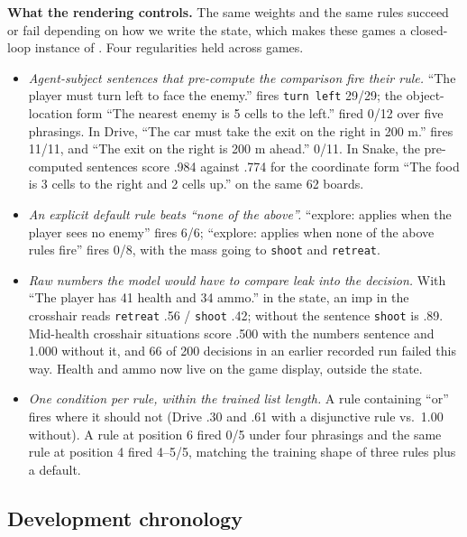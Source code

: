 \textbf{What the rendering controls.} The same weights and the same rules succeed or fail depending on
how we write the state, which makes these games a closed-loop instance of .
Four regularities held across games.
\begin{itemize}
  \item \emph{Agent-subject sentences that pre-compute the comparison fire their rule.} ``The player
  must turn left to face the enemy.'' fires \texttt{turn left} 29/29; the object-location form ``The
  nearest enemy is 5 cells to the left.'' fired 0/12 over five phrasings. In Drive, ``The car must take
  the exit on the right in 200 m.'' fires 11/11, and ``The exit on the right is 200 m ahead.'' 0/11. In
  Snake, the pre-computed sentences score .984 against .774 for the coordinate form ``The food is 3 cells
  to the right and 2 cells up.'' on the same 62 boards.
  \item \emph{An explicit default rule beats ``none of the above''.} ``explore: applies when the player
  sees no enemy'' fires 6/6; ``explore: applies when none of the above rules fire'' fires 0/8, with the
  mass going to \texttt{shoot} and \texttt{retreat}.
  \item \emph{Raw numbers the model would have to compare leak into the decision.} With ``The player has
  41 health and 34 ammo.'' in the state, an imp in the crosshair reads \texttt{retreat} .56 /
  \texttt{shoot} .42; without the sentence \texttt{shoot} is .89. Mid-health crosshair situations score
  .500 with the numbers sentence and 1.000 without it, and 66 of 200 decisions in an earlier recorded
  run failed this way. Health and ammo now live on the game display, outside the state.
  \item \emph{One condition per rule, within the trained list length.} A rule containing ``or'' fires
  where it should not (Drive .30 and .61 with a disjunctive rule vs.\ 1.00 without). A rule at position 6 fired
  0/5 under four phrasings and the same rule at position 4 fired 4--5/5, matching the training shape of
  three rules plus a default.
\end{itemize}

\subsection{Development chronology}
\label{app:chronology}

